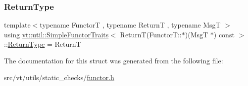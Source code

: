 \subsubsection{\texorpdfstring{Return\+Type}{ReturnType}}
{\footnotesize\ttfamily template$<$typename FunctorT , typename ReturnT , typename MsgT $>$ \\
using \hyperlink{structvt_1_1util_1_1_simple_functor_traits}{vt\+::util\+::\+Simple\+Functor\+Traits}$<$ ReturnT(Functor\+T\+::$\ast$)(MsgT $\ast$) const $>$\+::\hyperlink{structvt_1_1util_1_1_simple_functor_traits_3_01_return_t_07_functor_t_1_1_5_08_07_msg_t_01_5_08_01const_01_4_affaab9f38aa87410acecb852bc5c3866}{Return\+Type} =  ReturnT}



The documentation for this struct was generated from the following file\+:\begin{DoxyCompactItemize}
\item 
src/vt/utils/static\+\_\+checks/\hyperlink{functor_8h}{functor.\+h}\end{DoxyCompactItemize}
